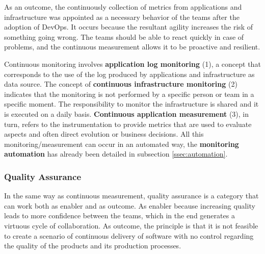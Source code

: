 As an outcome, the continuously collection of metrics from applications and
infrastructure was appointed as a necessary behavior of the teams after the adoption
of DevOps. It occurs because the resultant agility increases the risk of
something going wrong. The teams should be able to react quickly in case of
problems, and the continuous measurement allows it to be proactive and resilient.


Continuous monitoring involves \textbf{application log monitoring} (1), a
concept that corresponds to the use of the log produced by
applications and infrastructure as data source. The concept of
\textbf{continuous infrastructure monitoring} (2) indicates that the monitoring
is not performed by a specific person or team in a specific moment. The
responsibility to monitor the infrastructure is shared and it is executed on
a daily basis. \textbf{Continuous application measurement} (3), in turn, refers to
the instrumentation to provide metrics that are used to evaluate aspects and
often direct evolution or business decisions. All this monitoring/measurement
can occur in an automated way, the \textbf{monitoring automation} has already been
detailed in subsection \ref{ssec:automation}.

\subsubsection{Quality Assurance}

In the same way as continuous measurement, quality assurance is a category that
can work both as enabler and as outcome. As enabler because increasing quality
leads to more confidence between the teams, which in the end generates a virtuous
cycle of collaboration. As outcome, the principle is that it is not
feasible to create a scenario of continuous delivery of software with no control
regarding the quality of the products and its production processes.

